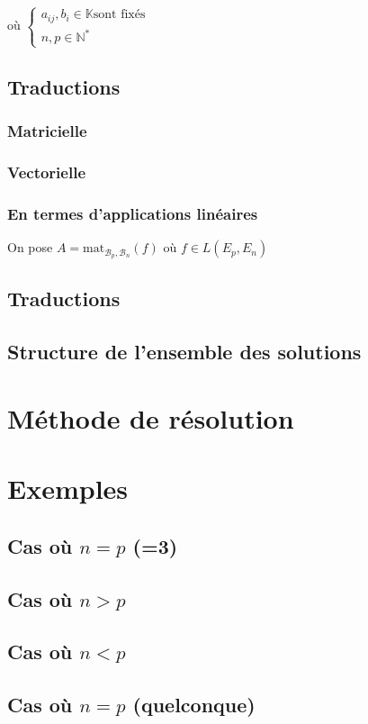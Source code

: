 \documentclass[12pt,a4paper,french]{book}
\begin{document}
			où \(\left\lbrace \begin{array}{ll}
				a_{ij},b_i \in \mathbb{K} \mbox{sont fixés} \\ n,p \in \mathbb{N}^{\ast}
			\end{array}\right.\)
			
		\subsection{Traductions}
			\subsubsection{Matricielle}
			\subsubsection{Vectorielle}
			\subsubsection{En termes d'applications linéaires}
				On pose $A = \mbox{mat}_{\mathcal{B}_p,\mathcal{B}_n}(f) \mbox{ où } f \in L(E_p,E_n)$
		\subsection{Traductions}
		\subsection{Structure de l'ensemble des solutions}
	\section{Méthode de résolution}
	\section{Exemples}
		\subsection{Cas où $n=p$ (=3)}
		\subsection{Cas où $n>p$}
		\subsection{Cas où $n<p$}
		\subsection{Cas où $n=p$ (quelconque)}
\end{document}
